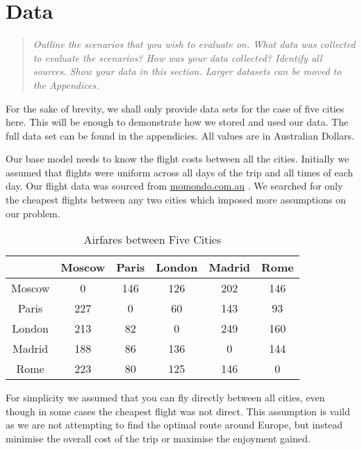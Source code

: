 \documentclass[12pt]{article}
\begin{document}
\section{Data} 
\label{sec:data}


\begin{quote} \textit{
Outline the scenarios that you wish to evaluate on. What data was collected to evaluate the
scenarios? How was your data collected? Identify all sources. Show your data in this section.
Larger datasets can be moved to the Appendices.
} \end{quote}

For the sake of brevity, we shall only provide data sets for the case of five cities here. This will be enough to demonstrate how we stored and used our data. The full data set can be found in the appendicies. All values are in Australian Dollars.

Our base model needs to know the flight costs between all the cities. Initially we assumed that flights were uniform across all days of the trip and all times of each day. Our flight data was sourced from \url{momondo.com.au} \cite{momondo}. We searched for only the cheapest flights between any two cities which imposed more assumptions on our problem.

\begin{table}[h]
\caption{Airfares between Five Cities}
\centering
\vspace{1mm}
\begin{tabular}{c|c|c|c|c|c}
\hline
\rule{0pt}{2ex}  & Moscow & Paris & London & Madrid & Rome \\
\hline
\rule{0pt}{2ex}Moscow & 0 & 146 & 126 & 202 & 146 \\
Paris & 227 & 0 & 60 & 143 & 93 \\
London & 213 & 82 & 0 & 249 & 160 \\
Madrid & 188 & 86 & 136 & 0 & 144 \\
Rome & 223 & 80 & 125 & 146 & 0 \\

\end{tabular}
\end{table}

For simplicity we assumed that you can fly directly between all cities, even though in some cases the cheapest flight was not direct. This assumption is vaild as we are not attempting to find the optimal route around Europe, but instead minimise the overall cost of the trip or maximise the enjoyment gained. 
\end{document}
